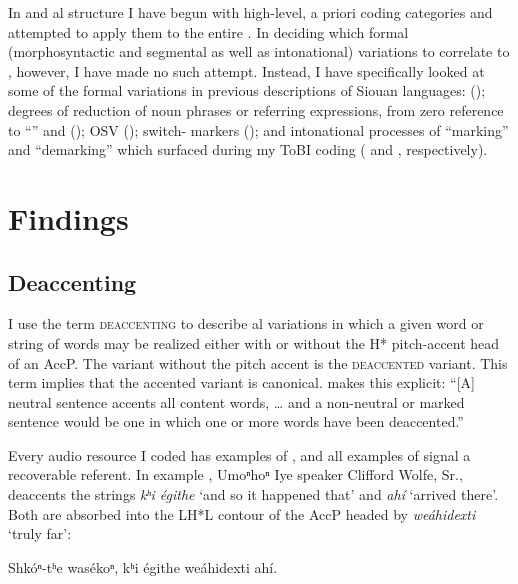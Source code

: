 \documentclass[output=paper]{LSP/langsci}
\begin{document}
In  and al structure I have begun with high-level, a priori coding categories and attempted to apply them to the entire . In deciding which formal (morphosyntactic and segmental as well as intonational) variations to correlate to , however, I have made no such attempt. Instead, I have specifically looked at some of the formal variations in previous descriptions of Siouan languages:  (); degrees of reduction of noun phrases or referring expressions, from zero reference to “” and  (); OSV  (); switch- markers (); and intonational processes of “marking” and “demarking” which surfaced during my ToBI coding ( and , respectively).

\section{Findings}\label{findings}

\subsection{Deaccenting}\label{deaccenting}

	I use the term \textsc{deaccenting} to describe al variations in which a given word or string of words may be realized either with or without the H* pitch-accent head of an AccP. The variant without the pitch accent is the \textsc{deaccented} variant. This term implies that the accented variant is canonical. \citet[100]{Bolinger1986} makes this explicit: “[A] neutral sentence accents all content words, … and a non-neutral or marked sentence would be one in which one or more words have been deaccented.”
	
Every audio resource I coded has examples of , and all examples of  signal a recoverable referent. In example , Umoⁿhoⁿ Iye speaker Clifford Wolfe, Sr., deaccents the strings \textit{kʰi égithe} `and so it happened that' and \textit{ahí} `arrived there'. Both are absorbed into the LH*L contour of the AccP headed by \textit{weáhidexti} `truly far':

\ea\label{wolfedeaccenting}
Shkóⁿ-tʰe wasékoⁿ, kʰi égithe weáhidexti ahí.\footnotemark
\end{document}
